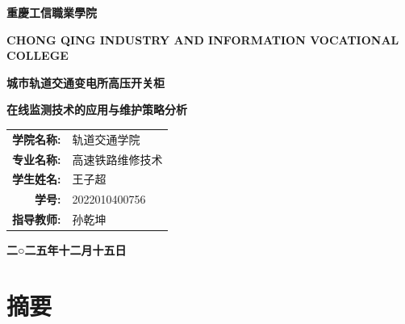\documentclass[a4paper,12pt]{article}
\begin{document}
\begin{titlepage}
    \centering
    \vspace*{1cm}
    {\Huge \textbf{重慶工信職業學院} \par}
    \vspace{0.5cm}
    {\Large \textbf{CHONG QING INDUSTRY AND INFORMATION VOCATIONAL COLLEGE} \par}

    \vspace{3cm}

    {\Huge \textbf{城市轨道交通变电所高压开关柜} \par}
    {\Huge \textbf{在线监测技术的应用与维护策略分析} \par}

    \vspace{4cm}

    \begin{large}
        \begin{tabular}{rl}
            \textbf{学院名称:} & 轨道交通学院 \\
            \textbf{专业名称:} & 高速铁路维修技术 \\
            \textbf{学生姓名:} & 王子超 \\
            \textbf{学号:}   & 2022010400756 \\
            \textbf{指导教师:} & 孙乾坤 \\
        \end{tabular}
    \end{large}

    \vspace{3cm}

    {\Large \textbf{二○二五年十二月十五日} \par}

\end{titlepage}

\section*{摘要}



\tableofcontents
\clearpage








\end{document}
